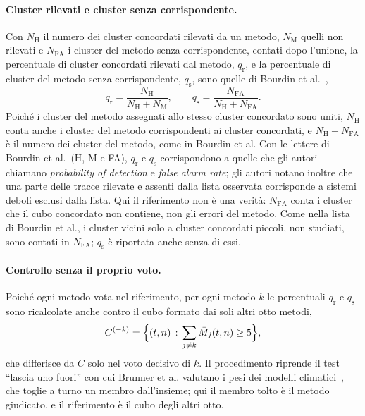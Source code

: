 \paragraph{Cluster rilevati e cluster senza corrispondente.} Con $N_{\mathrm{H}}$ il numero dei cluster concordati rilevati da un metodo, $N_{\mathrm{M}}$ quelli non rilevati e $N_{\mathrm{FA}}$ i cluster del metodo senza corrispondente, contati dopo l'unione, la percentuale di cluster concordati rilevati dal metodo, $q_{\mathrm{r}}$, e la percentuale di cluster del metodo senza corrispondente, $q_{\mathrm{s}}$, sono quelle di Bourdin et al.~\cite{bourdin2022tc},
\begin{equation}
q_{\mathrm{r}}=\frac{N_{\mathrm{H}}}{N_{\mathrm{H}}+N_{\mathrm{M}}},\qquad q_{\mathrm{s}}=\frac{N_{\mathrm{FA}}}{N_{\mathrm{H}}+N_{\mathrm{FA}}} .
\end{equation}
Poiché i cluster del metodo assegnati allo stesso cluster concordato sono uniti, $N_{\mathrm{H}}$ conta anche i cluster del metodo corrispondenti ai cluster concordati, e $N_{\mathrm{H}}+N_{\mathrm{FA}}$ è il numero dei cluster del metodo, come in Bourdin et al. Con le lettere di Bourdin et al.\ (H, M e FA), $q_{\mathrm{r}}$ e $q_{\mathrm{s}}$ corrispondono a quelle che gli autori chiamano \emph{probability of detection} e \emph{false alarm rate}; gli autori notano inoltre che una parte delle tracce rilevate e assenti dalla lista osservata corrisponde a sistemi deboli esclusi dalla lista. Qui il riferimento non è una verità: $N_{\mathrm{FA}}$ conta i cluster che il cubo concordato non contiene, non gli errori del metodo. Come nella lista di Bourdin et al., i cluster vicini solo a cluster concordati piccoli, non studiati, sono contati in $N_{\mathrm{FA}}$; $q_{\mathrm{s}}$ è riportata anche senza di essi.

\paragraph{Controllo senza il proprio voto.} Poiché ogni metodo vota nel riferimento, per ogni metodo $k$ le percentuali $q_{\mathrm{r}}$ e $q_{\mathrm{s}}$ sono ricalcolate anche contro il cubo formato dai soli altri otto metodi,
\begin{equation}
C^{(-k)}=\Bigl\{(t,n)\,:\,\sum_{j\neq k}\bar{M}_j(t,n)\ge5\Bigr\},
\end{equation}
che differisce da $C$ solo nel voto decisivo di $k$. Il procedimento riprende il test ``lascia uno fuori'' con cui Brunner et al. valutano i pesi dei modelli climatici~\cite{brunner2020weighting}, che toglie a turno un membro dall'insieme; qui il membro tolto è il metodo giudicato, e il riferimento è il cubo degli altri otto.

